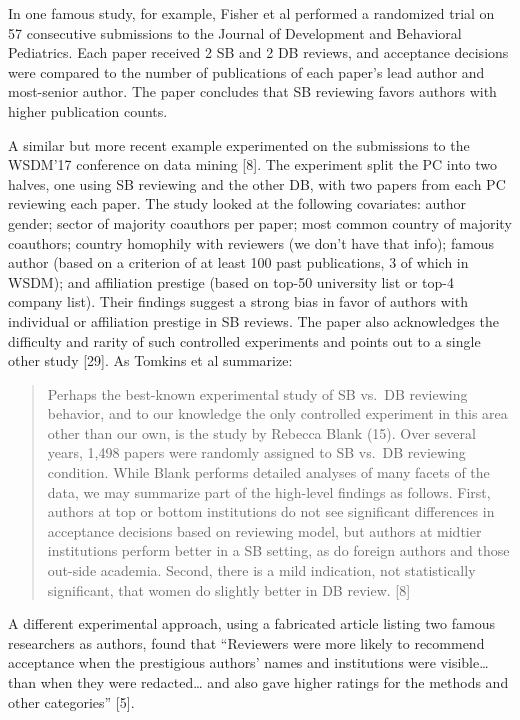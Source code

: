 \documentclass[12pt]{article}
\begin{document}
In one famous study, for example, Fisher et al performed a randomized trial on 57 consecutive submissions to the Journal of Development and Behavioral Pediatrics.
Each paper received 2 SB and 2 DB reviews, and acceptance decisions were compared to the number of publications of each paper's lead author and most-senior author.
The paper concludes that SB reviewing favors authors with higher publication counts.

A similar but more recent example experimented on the submissions to the WSDM'17 conference on data mining {[}8{]}.
The experiment split the PC into two halves, one using SB reviewing and the other DB, with two papers from each PC reviewing each paper.
The study looked at the following covariates: author gender; sector of majority coauthors per paper; most common country of majority coauthors; country homophily with reviewers (we don't have that info); famous author (based on a criterion of at least 100 past publications, 3 of which in WSDM); and affiliation prestige (based on top-50 university list or top-4 company list).
Their findings suggest a strong bias in favor of authors with individual or affiliation prestige in SB reviews.
The paper also acknowledges the difficulty and rarity of such controlled experiments and points out to a single other study {[}29{]}.
As Tomkins et al summarize:

\begin{quote}
Perhaps the best-known experimental study of SB vs.~DB reviewing behavior, and to our knowledge the only controlled experiment in this area other than our own, is the study by Rebecca Blank (15). Over several years, 1,498 papers were randomly assigned to SB vs.~DB reviewing condition. While Blank performs detailed analyses of many facets of the data, we may summarize part of the high-level findings as follows. First, authors at top or bottom institutions do not see significant differences in acceptance decisions based on reviewing model, but authors at midtier institutions perform better in a SB setting, as do foreign authors and those out-side academia. Second, there is a mild indication, not statistically significant, that women do slightly better in DB review. {[}8{]}
\end{quote}

A different experimental approach, using a fabricated article listing two famous researchers as authors, found that ``Reviewers were more likely to recommend acceptance when the prestigious authors' names and institutions were visible\ldots{} than when they were redacted\ldots{} and also gave higher ratings for the methods and other categories'' {[}5{]}.
\end{document}
